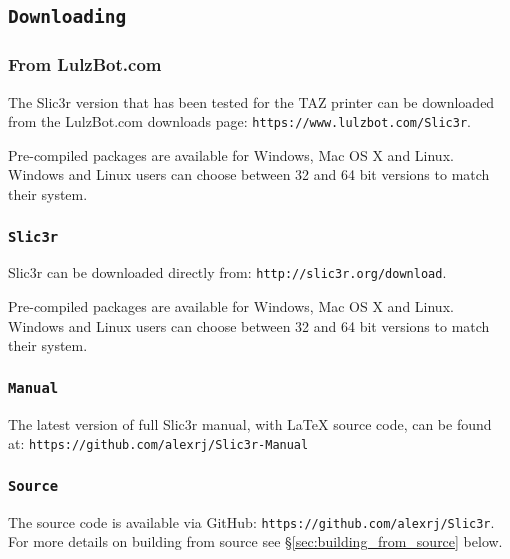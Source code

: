 

\subsection{\texttt{Downloading}}

\subsubsection{From LulzBot.com} %
\label{sub:from_LulzBot}
The Slic3r version that has been tested for the TAZ printer can be downloaded from the LulzBot.com downloads page: \texttt{https://www.lulzbot.com/Slic3r}.

Pre-compiled packages are available for Windows, Mac OS X and Linux.  Windows and Linux users can choose between 32 and 64 bit versions to match their system.

\subsubsection{\texttt{Slic3r}} %
\label{sub:slic3r}
Slic3r can be downloaded directly from: \texttt{http://slic3r.org/download}.

Pre-compiled packages are available for Windows, Mac OS X and Linux.  Windows and Linux users can choose between 32 and 64 bit versions to match their system.

\subsubsection{\texttt{Manual}} %
\label{sub:manual}

The latest version of full Slic3r manual, with {\LaTeX} source code, can be found at: \texttt{https://github.com/alexrj/Slic3r-Manual}


\subsubsection{\texttt{Source}} %
\label{sub:source}

The source code is available via GitHub: \texttt{https://github.com/alexrj/Slic3r}. For more details on building from source see §\ref{sec:building_from_source} below.

